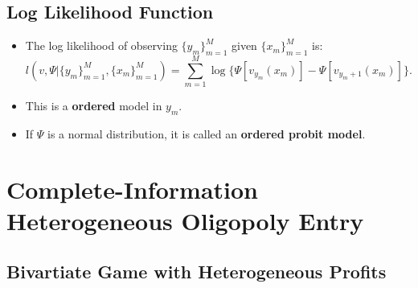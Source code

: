 \documentclass[
]{book}
\providecommand{\tightlist}{%
  \setlength{\itemsep}{0pt}\setlength{\parskip}{0pt}}
\begin{document}
\hypertarget{log-likelihood-function}{%
\subsection{Log Likelihood Function}\label{log-likelihood-function}}

\begin{itemize}
\tightlist
\item
  The log likelihood of observing \(\{y_m\}_{m = 1}^M\) given \(\{x_m\}_{m = 1}^M\) is:
  \[
  l(v, \Psi|\{y_m\}_{m = 1}^M,  \{x_m\}_{m = 1}^M) = \sum_{m = 1}^M \log\{\Psi[v_{y_m}(x_m)] - \Psi[v_{y_m + 1}(x_m)]\}.
  \]
\item
  This is a \textbf{ordered} model in \(y_m\).
\item
  If \(\Psi\) is a normal distribution, it is called an \textbf{ordered probit model}.
\end{itemize}

\hypertarget{complete-information-heterogeneous-oligopoly-entry}{%
\section{Complete-Information Heterogeneous Oligopoly Entry}\label{complete-information-heterogeneous-oligopoly-entry}}

\hypertarget{bivartiate-game-with-heterogeneous-profits}{%
\subsection{Bivartiate Game with Heterogeneous Profits}\label{bivartiate-game-with-heterogeneous-profits}}
\end{document}
